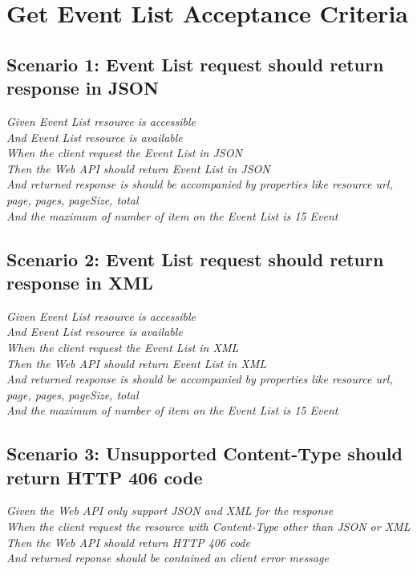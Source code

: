 \documentclass[a4paper, 12pt, oneside]{report}
\begin{document}
\section{Get Event List Acceptance Criteria}

\subsection{Scenario 1: Event List request should return response in JSON}

\onehalfspacing \textit{Given Event List resource is accessible\\
And Event List resource is available\\
When the client request the Event List in JSON\\
Then the Web API should return Event List in JSON\\
And returned response is should be accompanied by properties like resource url, page, pages, pageSize, total\\
And the maximum of number of item on the Event List is 15 Event}

\subsection{Scenario 2: Event List request should return response in XML}

\onehalfspacing \textit{Given Event List resource is accessible\\
And Event List resource is available\\
When the client request the Event List in XML\\
Then the Web API should return Event List in XML\\
And returned response is should be accompanied by properties like resource url, page, pages, pageSize, total\\
And the maximum of number of item on the Event List is 15 Event}

\subsection{Scenario 3: Unsupported Content-Type should return HTTP 406 code}

\onehalfspacing \textit{Given the Web API only support JSON and XML for the response\\
When the client request the resource with Content-Type other than JSON or XML\\
Then the Web API should return HTTP 406 code\\
And returned reponse should be contained an client error message}
\end{document}
